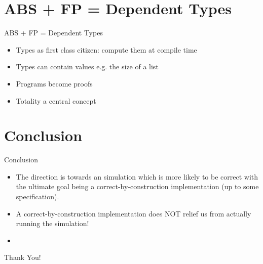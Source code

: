 \documentclass{beamer}
\begin{document}
\section{ABS + FP = Dependent Types}
\begin{frame}{ABS + FP = Dependent Types}
  \begin{itemize}
    \item Types as first class citizen: compute them at compile time
    \item Types can contain values e.g. the size of a list 
    \item Programs become proofs
    \item Totality a central concept
  \end{itemize}
\end{frame}

\section{Conclusion}
\begin{frame}{Conclusion}
  \begin{itemize}
    \item The direction is towards an simulation which is more likely to be correct with the ultimate goal being a correct-by-construction implementation (up to some specification).
    \item A correct-by-construction implementation does NOT relief us from actually running the simulation!
    \item 
  \end{itemize}
\end{frame}

\begin{frame}{}
  \begin{center}
  Thank You!
  \end{center}
\end{frame}
\end{document}
